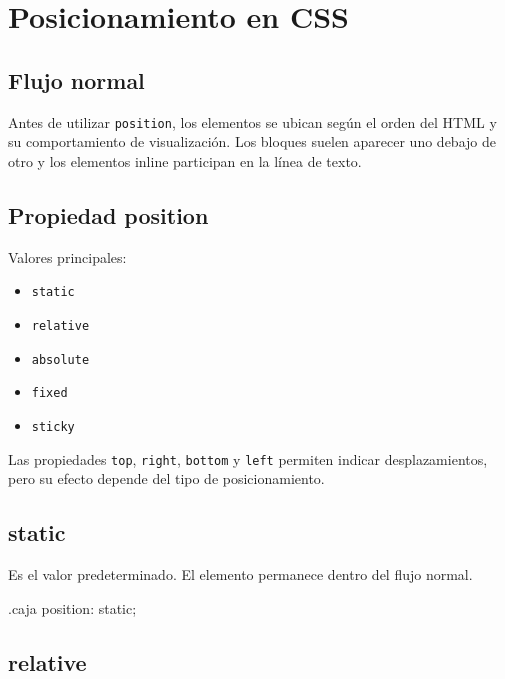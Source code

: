 \documentclass[11pt]{article}
\begin{document}
    \section{Posicionamiento en CSS}

    \subsection{Flujo normal}

    Antes de utilizar \texttt{position}, los elementos se ubican según el orden del HTML y su comportamiento de visualización. Los bloques suelen aparecer uno debajo de otro y los elementos inline participan en la línea de texto.

    \subsection{Propiedad position}

    Valores principales:

    \begin{itemize}
        \item \texttt{static}
        \item \texttt{relative}
        \item \texttt{absolute}
        \item \texttt{fixed}
        \item \texttt{sticky}
    \end{itemize}

    Las propiedades \texttt{top}, \texttt{right}, \texttt{bottom} y \texttt{left} permiten indicar desplazamientos, pero su efecto depende del tipo de posicionamiento.

    \subsection{static}

    Es el valor predeterminado. El elemento permanece dentro del flujo normal.

    \begin{csscodedark}
        .caja {
            position: static;
        }
    \end{csscodedark}

    \subsection{relative}
\end{document}
